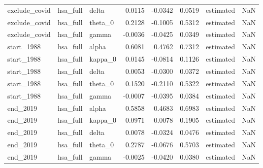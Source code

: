 \begin{tabular}{lllrrrlr}
exclude\_covid & hsa\_full & delta & 0.0115 & -0.0342 & 0.0519 & estimated & NaN \\
exclude\_covid & hsa\_full & theta\_0 & 0.2128 & -0.1005 & 0.5312 & estimated & NaN \\
exclude\_covid & hsa\_full & gamma & -0.0036 & -0.0425 & 0.0349 & estimated & NaN \\
start\_1988 & hsa\_full & alpha & 0.6081 & 0.4762 & 0.7312 & estimated & NaN \\
start\_1988 & hsa\_full & kappa\_0 & 0.0145 & -0.0814 & 0.1126 & estimated & NaN \\
start\_1988 & hsa\_full & delta & 0.0053 & -0.0300 & 0.0372 & estimated & NaN \\
start\_1988 & hsa\_full & theta\_0 & 0.1520 & -0.2110 & 0.5322 & estimated & NaN \\
start\_1988 & hsa\_full & gamma & -0.0007 & -0.0395 & 0.0384 & estimated & NaN \\
end\_2019 & hsa\_full & alpha & 0.5858 & 0.4683 & 0.6983 & estimated & NaN \\
end\_2019 & hsa\_full & kappa\_0 & 0.0971 & 0.0078 & 0.1905 & estimated & NaN \\
end\_2019 & hsa\_full & delta & 0.0078 & -0.0324 & 0.0476 & estimated & NaN \\
end\_2019 & hsa\_full & theta\_0 & 0.2787 & -0.0676 & 0.5703 & estimated & NaN \\
end\_2019 & hsa\_full & gamma & -0.0025 & -0.0420 & 0.0380 & estimated & NaN \\
\bottomrule
\end{tabular}
